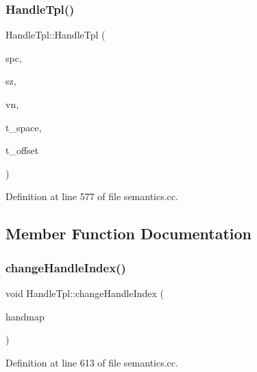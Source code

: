 \subsubsection{\texorpdfstring{HandleTpl()}{HandleTpl()}\hspace{0.1cm}{\footnotesize\ttfamily [3/3]}}
{\footnotesize\ttfamily Handle\+Tpl\+::\+Handle\+Tpl (\begin{DoxyParamCaption}\item[{const \mbox{\hyperlink{class_const_tpl}{Const\+Tpl}} \&}]{spc,  }\item[{const \mbox{\hyperlink{class_const_tpl}{Const\+Tpl}} \&}]{sz,  }\item[{const \mbox{\hyperlink{class_varnode_tpl}{Varnode\+Tpl}} $\ast$}]{vn,  }\item[{\mbox{\hyperlink{class_addr_space}{Addr\+Space}} $\ast$}]{t\+\_\+space,  }\item[{\mbox{\hyperlink{types_8h_a2db313c5d32a12b01d26ac9b3bca178f}{uintb}}}]{t\+\_\+offset }\end{DoxyParamCaption})}



Definition at line 577 of file semantics.\+cc.



\subsection{Member Function Documentation}
\mbox{\label{class_handle_tpl_acb53d25d53479eff5c054f16a023c2b2}} 
\subsubsection{\texorpdfstring{changeHandleIndex()}{changeHandleIndex()}}
{\footnotesize\ttfamily void Handle\+Tpl\+::change\+Handle\+Index (\begin{DoxyParamCaption}\item[{const vector$<$ int4 $>$ \&}]{handmap }\end{DoxyParamCaption})}



Definition at line 613 of file semantics.\+cc.

